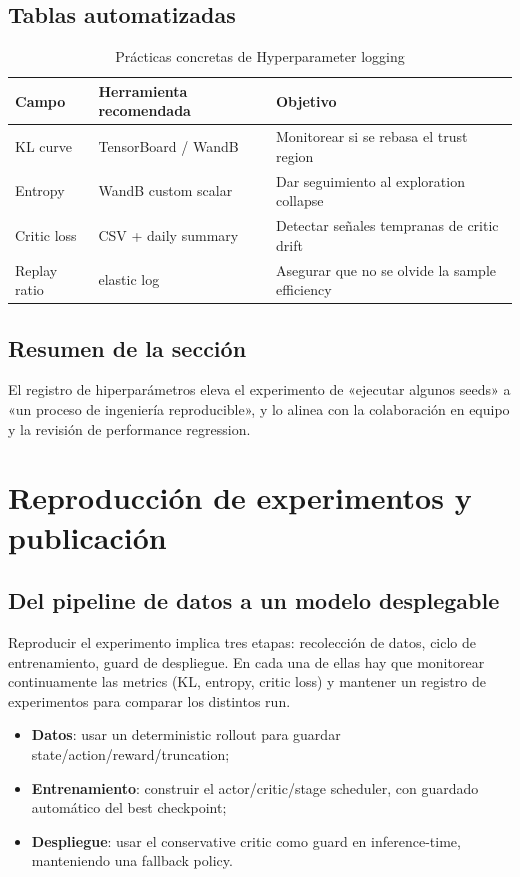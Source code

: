 \documentclass[a4paper]{article}
\begin{document}
\subsection{Tablas automatizadas}

\begin{table}[H]
\centering
\begin{tabular}{p{}p{}p{}}
\toprule
Campo & Herramienta recomendada & Objetivo \\
\midrule
KL curve & TensorBoard / WandB & Monitorear si se rebasa el trust region \\
Entropy & WandB custom scalar & Dar seguimiento al exploration collapse \\
Critic loss & CSV + daily summary & Detectar señales tempranas de critic drift \\
Replay ratio & elastic log & Asegurar que no se olvide la sample efficiency \\
\bottomrule
\end{tabular}
\caption{Prácticas concretas de Hyperparameter logging}
\end{table}

\subsection{Resumen de la sección}

El registro de hiperparámetros eleva el experimento de «ejecutar algunos seeds» a «un proceso de ingeniería reproducible», y lo alinea con la colaboración en equipo y la revisión de performance regression.

\section{Reproducción de experimentos y publicación}

\subsection{Del pipeline de datos a un modelo desplegable}

Reproducir el experimento implica tres etapas: recolección de datos, ciclo de entrenamiento, guard de despliegue. En cada una de ellas hay que monitorear continuamente las metrics (KL, entropy, critic loss) y mantener un registro de experimentos para comparar los distintos run.

\begin{itemize}
    \item \textbf{Datos}: usar un deterministic rollout para guardar state/action/reward/truncation;
    \item \textbf{Entrenamiento}: construir el actor/critic/stage scheduler, con guardado automático del best checkpoint;
    \item \textbf{Despliegue}: usar el conservative critic como guard en inference-time, manteniendo una fallback policy.
\end{itemize}
\end{document}
